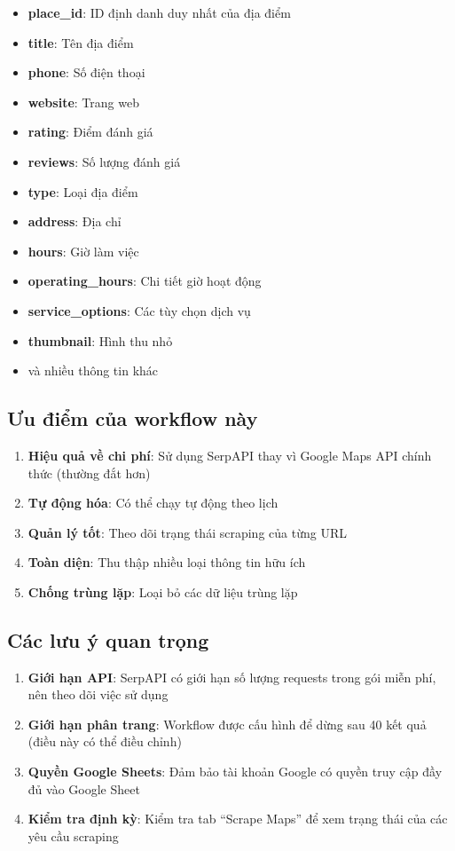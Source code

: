 \begin{itemize}
  \item \textbf{place\_id}: ID định danh duy nhất của địa điểm
  \item \textbf{title}: Tên địa điểm
  \item \textbf{phone}: Số điện thoại
  \item \textbf{website}: Trang web
  \item \textbf{rating}: Điểm đánh giá
  \item \textbf{reviews}: Số lượng đánh giá
  \item \textbf{type}: Loại địa điểm
  \item \textbf{address}: Địa chỉ
  \item \textbf{hours}: Giờ làm việc
  \item \textbf{operating\_hours}: Chi tiết giờ hoạt động
  \item \textbf{service\_options}: Các tùy chọn dịch vụ
  \item \textbf{thumbnail}: Hình thu nhỏ
  \item và nhiều thông tin khác
\end{itemize}

\subsection{Ưu điểm của workflow này}

\begin{enumerate}
  \item \textbf{Hiệu quả về chi phí}: Sử dụng SerpAPI thay vì Google Maps API chính thức (thường đắt hơn)
  \item \textbf{Tự động hóa}: Có thể chạy tự động theo lịch
  \item \textbf{Quản lý tốt}: Theo dõi trạng thái scraping của từng URL
  \item \textbf{Toàn diện}: Thu thập nhiều loại thông tin hữu ích
  \item \textbf{Chống trùng lặp}: Loại bỏ các dữ liệu trùng lặp
\end{enumerate}

\subsection{Các lưu ý quan trọng}

\begin{enumerate}
  \item \textbf{Giới hạn API}: SerpAPI có giới hạn số lượng requests trong gói miễn phí, nên theo dõi việc sử dụng
  \item \textbf{Giới hạn phân trang}: Workflow được cấu hình để dừng sau 40 kết quả (điều này có thể điều chỉnh)
  \item \textbf{Quyền Google Sheets}: Đảm bảo tài khoản Google có quyền truy cập đầy đủ vào Google Sheet
  \item \textbf{Kiểm tra định kỳ}: Kiểm tra tab ``Scrape Maps'' để xem trạng thái của các yêu cầu scraping
\end{enumerate}

